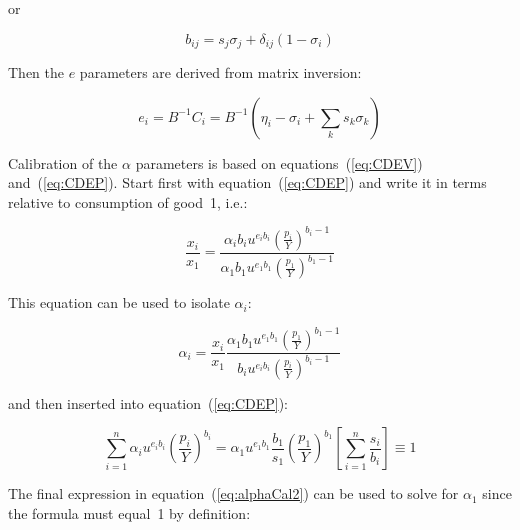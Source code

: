 \noindent or

\begin{displaymath}
{b_{ij}} = {s_j}{\sigma_j} + {\delta_{ij}}(1 - {\sigma_i})
\end{displaymath}

\noindent Then the $e$ parameters are derived from matrix inversion:

\begin{equation}
\label{eq:ECAL}
{e_i} = {B^{ - 1}}{C_i} = {B^{ - 1}}\left( {{\eta_i} - {\sigma_i}
+ \sum\limits_k {{s_k}{\sigma_k}} } \right)
\end{equation}

Calibration of the $\alpha$ parameters is based on equations~(\ref{eq:CDEV}) and~(\ref{eq:CDEP}).
Start first with equation~(\ref{eq:CDEP}) and write it in terms relative to consumption
of good~1, i.e.:

\begin{equation}
\frac{{{x_i}}}{{{x_1}}} =
\frac {\displaystyle {{\alpha_i}{b_i}{u^{{e_i}{b_i}}}
{{\left( {\frac{\displaystyle {{p_i}}}{\displaystyle Y}} \right)}^{{b_i} - 1}}}}
{\displaystyle {{\alpha_1}{b_1}{u^{{e_1}{b_1}}}
{{\left( {\frac{\displaystyle {{p_1}}}{\displaystyle Y}} \right)}^{{b_1} - 1}}}}
\end{equation}

\noindent This equation can be used to isolate $\alpha_i$:

\begin{equation}
\label{eq:alphaCal1}
{\alpha_i} = \frac{\displaystyle {{x_i}}}{\displaystyle {{x_1}}}
\frac{\displaystyle {{\alpha_1}{b_1} {\displaystyle u^{{e_1}{b_1}}}
{{\left( {\frac{\displaystyle {{p_1}}}{\displaystyle Y}} \right)}^{{b_1} - 1}}}}
{\displaystyle {{b_i}{u^{{e_i}{b_i}}}
{{\left( {\frac{\displaystyle {{p_i}}}{\displaystyle Y}} \right)}^{{b_i} - 1}}}}
\end{equation}

\noindent and then inserted into equation~(\ref{eq:CDEP}):

\begin{equation}
\label{eq:alphaCal2}
\sum\limits_{i = 1}^n {{\alpha_i}{u^{{e_i}{b_i}}}{{\left( {\frac{{{p_i}}}{Y}} \right)}^{{b_i}}}}
= {\alpha_1}{u^{{e_1}{b_1}}}\frac{{{b_1}}}{{{s_1}}}{\left( {\frac{{{p_1}}}{Y}} \right)^{{b_1}}}
\left[ {\sum\limits_{i = 1}^n {\frac{{{s_i}}}{{{b_i}}}} } \right] \equiv 1
\end{equation}

\noindent The final expression in equation~(\ref{eq:alphaCal2}) can be used to solve for
$\alpha_1$ since the formula must equal~1 by definition:

